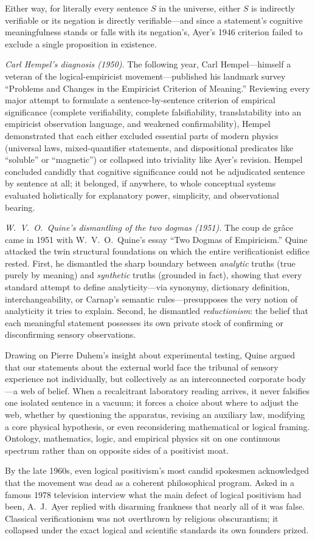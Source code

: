 Either way, for literally every sentence $S$ in the universe, either $S$ is indirectly verifiable or its negation is directly verifiable---and since a statement's cognitive meaningfulness stands or falls with its negation's, Ayer's 1946 criterion failed to exclude a single proposition in existence.

\emph{Carl Hempel's diagnosis (1950).} The following year, Carl Hempel---himself a veteran of the logical-empiricist movement---published his landmark survey ``Problems and Changes in the Empiricist Criterion of Meaning.'' Reviewing every major attempt to formulate a sentence-by-sentence criterion of empirical significance (complete verifiability, complete falsifiability, translatability into an empiricist observation language, and weakened confirmability), Hempel demonstrated that each either excluded essential parts of modern physics (universal laws, mixed-quantifier statements, and dispositional predicates like ``soluble'' or ``magnetic'') or collapsed into triviality like Ayer's revision. Hempel concluded candidly that cognitive significance could not be adjudicated sentence by sentence at all; it belonged, if anywhere, to whole conceptual systems evaluated holistically for explanatory power, simplicity, and observational bearing.

\emph{W.\ V.\ O.\ Quine's dismantling of the two dogmas (1951).} The coup de gr\^ace came in 1951 with W.\ V.\ O.\ Quine's essay ``Two Dogmas of Empiricism.'' Quine attacked the twin structural foundations on which the entire verificationist edifice rested. First, he dismantled the sharp boundary between \emph{analytic} truths (true purely by meaning) and \emph{synthetic} truths (grounded in fact), showing that every standard attempt to define analyticity---via synonymy, dictionary definition, interchangeability, or Carnap's semantic rules---presupposes the very notion of analyticity it tries to explain. Second, he dismantled \emph{reductionism}: the belief that each meaningful statement possesses its own private stock of confirming or disconfirming sensory observations.

Drawing on Pierre Duhem's insight about experimental testing, Quine argued that our statements about the external world face the tribunal of sensory experience not individually, but collectively as an interconnected corporate body---a web of belief. When a recalcitrant laboratory reading arrives, it never falsifies one isolated sentence in a vacuum; it forces a choice about where to adjust the web, whether by questioning the apparatus, revising an auxiliary law, modifying a core physical hypothesis, or even reconsidering mathematical or logical framing. Ontology, mathematics, logic, and empirical physics sit on one continuous spectrum rather than on opposite sides of a positivist moat.

By the late 1960s, even logical positivism's most candid spokesmen acknowledged that the movement was dead as a coherent philosophical program. Asked in a famous 1978 television interview what the main defect of logical positivism had been, A.\ J.\ Ayer replied with disarming frankness that nearly all of it was false. Classical verificationism was not overthrown by religious obscurantism; it collapsed under the exact logical and scientific standards its own founders prized.
